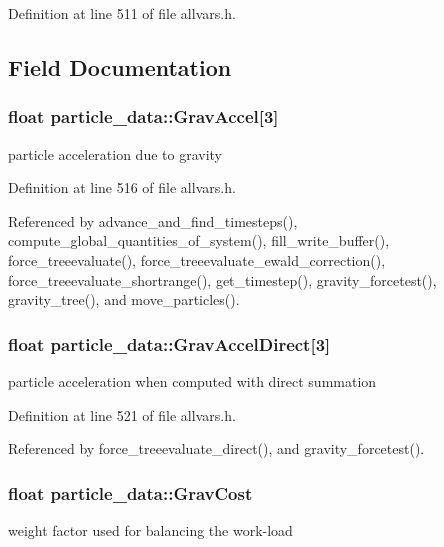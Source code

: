 Definition at line 511 of file allvars.h.



\subsection{Field Documentation}
\hypertarget{structparticle__data_a601ab390c85cd05a5c965e3353d403f3}{
\subsubsection[{GravAccel}]{\setlength{\rightskip}{0pt plus 5cm}float {\bf particle\_\-data::GravAccel}\mbox{[}3\mbox{]}}}
\label{structparticle__data_a601ab390c85cd05a5c965e3353d403f3}
particle acceleration due to gravity 

Definition at line 516 of file allvars.h.



Referenced by advance\_\-and\_\-find\_\-timesteps(), compute\_\-global\_\-quantities\_\-of\_\-system(), fill\_\-write\_\-buffer(), force\_\-treeevaluate(), force\_\-treeevaluate\_\-ewald\_\-correction(), force\_\-treeevaluate\_\-shortrange(), get\_\-timestep(), gravity\_\-forcetest(), gravity\_\-tree(), and move\_\-particles().

\hypertarget{structparticle__data_ae4d6efa44515e66a9b7806d8d57a88bf}{
\subsubsection[{GravAccelDirect}]{\setlength{\rightskip}{0pt plus 5cm}float {\bf particle\_\-data::GravAccelDirect}\mbox{[}3\mbox{]}}}
\label{structparticle__data_ae4d6efa44515e66a9b7806d8d57a88bf}
particle acceleration when computed with direct summation 

Definition at line 521 of file allvars.h.



Referenced by force\_\-treeevaluate\_\-direct(), and gravity\_\-forcetest().

\hypertarget{structparticle__data_a2f34828ae7803611a4e86bb201697317}{
\subsubsection[{GravCost}]{\setlength{\rightskip}{0pt plus 5cm}float {\bf particle\_\-data::GravCost}}}
\label{structparticle__data_a2f34828ae7803611a4e86bb201697317}
weight factor used for balancing the work-\/load 


